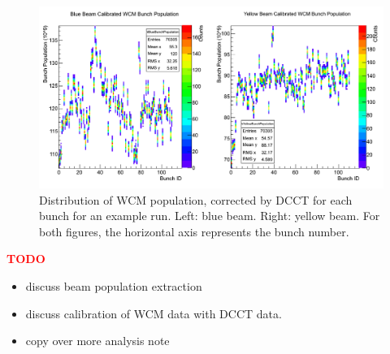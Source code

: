 \begin{figure}
  \centering
  \includegraphics[width=\linewidth]{./figures/359711_bunch_population.png}
  \caption{
    Distribution of WCM population, corrected by DCCT for each bunch for an
    example run. Left: blue beam. Right: yellow beam. For both figures, the
    horizontal axis represents the bunch number.
  }
  \label{fig:bunch_population_example}
\end{figure}

\textcolor{red}{\textbf{TODO}}
\begin{itemize}
    \item discuss beam population extraction
    \item discuss calibration of WCM data with DCCT data.
    \item copy over more analysis note
\end{itemize}
